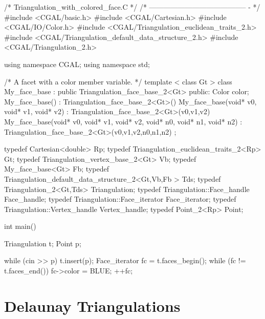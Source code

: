 \begin{cprog}
/*  Triangulation_with_colored_face.C        */
/*  -----------------------------------------   - */
#include <CGAL/basic.h>
#include <CGAL/Cartesian.h>
#include <CGAL/IO/Color.h>
#include <CGAL/Triangulation_euclidean_traits_2.h>
#include <CGAL/Triangulation_default_data_structure_2.h>
#include <CGAL/Triangulation_2.h>

using namespace CGAL;
using namespace std;

/* A facet with a color member variable. */
template < class Gt >
class My_face_base : public Triangulation_face_base_2<Gt>
{
public:
  Color color;
  My_face_base() :
    Triangulation_face_base_2<Gt>() {}
  My_face_base(void* v0, void* v1, void* v2) : 
    Triangulation_face_base_2<Gt>(v0,v1,v2) {}
  My_face_base(void* v0, void* v1, void* v2, void* n0, void* n1, void* n2) : 
    Triangulation_face_base_2<Gt>(v0,v1,v2,n0,n1,n2) {}
};

typedef Cartesian<double> Rp;
typedef Triangulation_euclidean_traits_2<Rp> Gt;
typedef Triangulation_vertex_base_2<Gt> Vb;
typedef My_face_base<Gt> Fb;
typedef Triangulation_default_data_structure_2<Gt,Vb,Fb > Tds;
typedef Triangulation_2<Gt,Tds> Triangulation;
typedef Triangulation::Face_handle Face_handle;
typedef Triangulation::Face_iterator Face_iterator;
typedef Triangulation::Vertex_handle Vertex_handle;
typedef Point_2<Rp>  Point;

int main() {
    Triangulation t;
    Point p;
   
    while (cin >> p){
        t.insert(p);
    }
    Face_iterator fc = t.faces_begin();
    while (fc != t.faces_end()) {
	fc->color = BLUE;
	++fc;
    }
}

\end{cprog}


\section{Delaunay Triangulations}
\label{I1_Sect_Delaunay}

